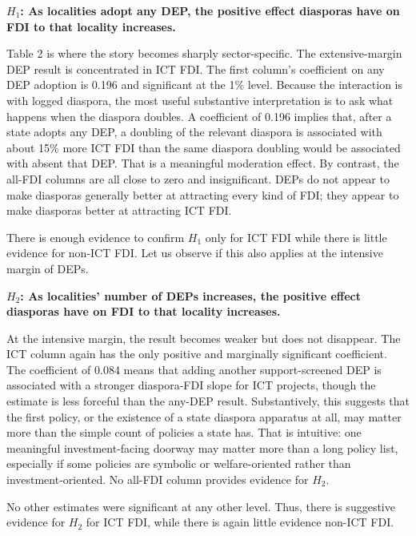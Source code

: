 \documentclass[doublespace,nopageskip]{UVAthesis}
\begin{document}
\textbf{$H_1$: As localities adopt any DEP, the positive effect diasporas have on FDI to that locality increases.}



Table 2 is where the story becomes sharply sector-specific. The extensive-margin DEP result is concentrated in ICT FDI. The first column's coefficient on any DEP adoption is 0.196 and significant at the 1\% level. Because the interaction is with logged diaspora, the most useful substantive interpretation is to ask what happens when the diaspora doubles. A coefficient of 0.196 implies that, after a state adopts any DEP, a doubling of the relevant diaspora is associated with about 15\% more ICT FDI than the same diaspora doubling would be associated with absent that DEP. That is a meaningful moderation effect. By contrast, the all-FDI columns are all close to zero and insignificant. DEPs do not appear to make diasporas generally better at attracting every kind of FDI; they appear to make diasporas better at attracting ICT FDI.

There is enough evidence to confirm $H_1$ only for ICT FDI while there is little evidence for non-ICT FDI. Let us observe if this also applies at the intensive margin of DEPs.

\textbf{$H_2$: As localities' number of DEPs increases, the positive effect diasporas have on FDI to that locality increases.}



At the intensive margin, the result becomes weaker but does not disappear. The ICT column again has the only positive and marginally significant coefficient. The coefficient of 0.084 means that adding another support-screened DEP is associated with a stronger diaspora-FDI slope for ICT projects, though the estimate is less forceful than the any-DEP result. Substantively, this suggests that the first policy, or the existence of a state diaspora apparatus at all, may matter more than the simple count of policies a state has. That is intuitive: one meaningful investment-facing doorway may matter more than a long policy list, especially if some policies are symbolic or welfare-oriented rather than investment-oriented. No all-FDI column provides evidence for $H_2$.

No other estimates were significant at any other level. Thus, there is suggestive evidence for $H_2$ for ICT FDI, while there is again little evidence non-ICT FDI.
\end{document}
